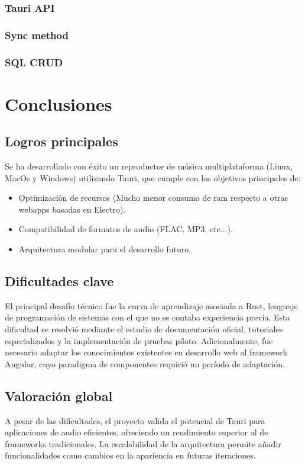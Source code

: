 \documentclass[11pt, a4paper]{article}
\begin{document}
            \subsubsection{Tauri API}

            \subsubsection{Sync method}

            \subsubsection{SQL CRUD}


\section{Conclusiones}

        \subsection{Logros principales}

        Se ha desarrollado con éxito un reproductor de música multiplataforma (Linux, MacOs y Windows) utilizando Tauri, que cumple con los objetivos principales de:

        \begin{itemize}
            \item Optimización de recursos (Mucho menor consumo de ram respecto a otras webapps basadas en Electro).
            \item Compatibilidad de formatos de audio (FLAC, MP3, etc...).
            \item Arquitectura modular para el desarrollo futuro.
        \end{itemize}

        \subsection{Dificultades clave}

        El principal desafío técnico fue la curva de aprendizaje asociada a Rust, lenguaje de programación de sistemas con el que no se contaba experiencia previa. Esta dificultad se resolvió mediante el estudio de documentación oficial, tutoriales especializados y la implementación de pruebas piloto. Adicionalmente, fue necesario adaptar los conocimientos existentes en desarrollo web al framework Angular, cuyo paradigma de componentes requirió un período de adaptación.

        \subsection{Valoración global}

        A pesar de las dificultades, el proyecto valida el potencial de Tauri para aplicaciones de audio eficientes, ofreciendo un rendimiento superior al de frameworks tradicionales. La escalabilidad de la arquitectura permite añadir funcionalidades como cambios en la apariencia en futuras iteraciones.
\end{document}
